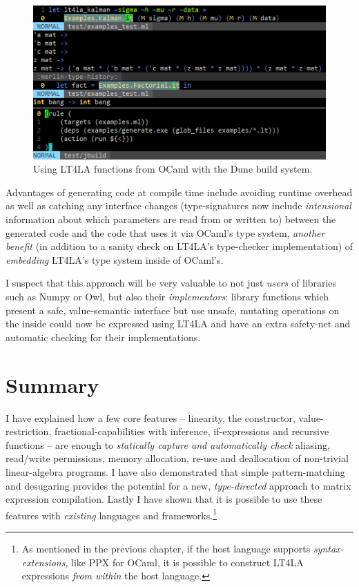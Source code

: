 \begin{figure}[t]
    \centering
    \includegraphics[width=\textwidth]{impl_build}
    \caption{Using LT4LA functions from OCaml with the Dune
        build system.}\label{fig:build}
\end{figure}

Advantages of generating code at compile time include avoiding runtime overhead
as well as catching any interface changes (type-signatures now include
\emph{intensional} information about which parameters are read from or written
to) between the generated code and the code that uses it via OCaml's type
system, \emph{another benefit} (in addition to a sanity check on LT4LA's
type-checker implementation) of \emph{embedding} LT4LA's type system inside of
OCaml's.

I suspect that this approach will be very valuable to not just \emph{users} of
libraries such as Numpy or Owl, but also their \emph{implementors}: library
functions which present a safe, value-semantic interface but use unsafe,
mutating operations on the inside could now be expressed using LT4LA and have
an extra safety-net and automatic checking for their implementations.

\clearpage%
\section{Summary}

I have explained how a few core features -- linearity, the 
constructor, value-restriction, fractional-capabilities with inference,
if-expressions and recursive functions -- are enough to \emph{statically
capture and automatically check} aliasing, read/write permissions, memory
allocation, re-use and deallocation of non-trivial linear-algebra programs. I
have also demonstrated that simple pattern-matching and desugaring provides the
potential for a new, \emph{type-directed} approach to matrix expression
compilation. Lastly I have shown that it is possible to use these features with
\emph{existing} languages and frameworks.\footnote{As mentioned in the previous
chapter, if the host language supports \emph{syntax-extensions}, like PPX
for OCaml, it is possible to construct LT4LA expressions \emph{from within} the
host language.}

